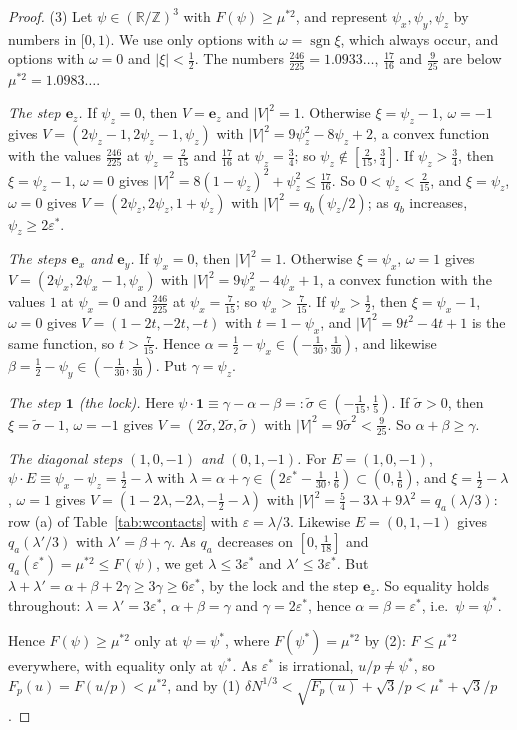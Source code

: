\documentclass[11pt]{amsart}
\theoremstyle{definition}
\theoremstyle{plain}
\newcommand{\Z}{\mathbb{Z}}
\newcommand{\e}{\mathbf{e}}
\DeclareMathOperator{\sgn}{sgn}
\providecommand{\R}{\mathbb{R}}
\begin{document}
\begin{proof}
(3) Let $\psi\in(\R/\Z)^3$ with $F(\psi)\ge\mu^{*2}$, and represent $\psi_x,\psi_y,\psi_z$ by numbers in $[0,1)$. We use only options with $\omega=\sgn\xi$, which always occur, and options with $\omega=0$ and $|\xi|<\frac12$. The numbers $\frac{246}{225}=1.0933\ldots$, $\frac{17}{16}$ and $\frac9{25}$ are below $\mu^{*2}=1.0983\ldots$.

\emph{The step $\e_z$.} If $\psi_z=0$, then $V=\e_z$ and $|V|^2=1$. Otherwise $\xi=\psi_z-1$, $\omega=-1$ gives $V=(2\psi_z-1,2\psi_z-1,\psi_z)$ with $|V|^2=9\psi_z^2-8\psi_z+2$, a convex function with the values $\frac{246}{225}$ at $\psi_z=\frac2{15}$ and $\frac{17}{16}$ at $\psi_z=\frac34$; so $\psi_z\notin[\frac2{15},\frac34]$. If $\psi_z>\frac34$, then $\xi=\psi_z-1$, $\omega=0$ gives $|V|^2=8(1-\psi_z)^2+\psi_z^2\le\frac{17}{16}$. So $0<\psi_z<\frac2{15}$, and $\xi=\psi_z$, $\omega=0$ gives $V=(2\psi_z,2\psi_z,1+\psi_z)$ with $|V|^2=q_b(\psi_z/2)$; as $q_b$ increases, $\psi_z\ge2\varepsilon^*$.

\emph{The steps $\e_x$ and $\e_y$.} If $\psi_x=0$, then $|V|^2=1$. Otherwise $\xi=\psi_x$, $\omega=1$ gives $V=(2\psi_x,2\psi_x-1,\psi_x)$ with $|V|^2=9\psi_x^2-4\psi_x+1$, a convex function with the values $1$ at $\psi_x=0$ and $\frac{246}{225}$ at $\psi_x=\frac7{15}$; so $\psi_x>\frac7{15}$. If $\psi_x>\frac12$, then $\xi=\psi_x-1$, $\omega=0$ gives $V=(1-2t,-2t,-t)$ with $t=1-\psi_x$, and $|V|^2=9t^2-4t+1$ is the same function, so $t>\frac7{15}$. Hence $\alpha=\frac12-\psi_x\in(-\frac1{30},\frac1{30})$, and likewise $\beta=\frac12-\psi_y\in(-\frac1{30},\frac1{30})$. Put $\gamma=\psi_z$.

\emph{The step $\mathbf 1$ (the lock).} Here $\psi\cdot\mathbf 1\equiv\gamma-\alpha-\beta=:\tilde\sigma\in(-\frac1{15},\frac15)$. If $\tilde\sigma>0$, then $\xi=\tilde\sigma-1$, $\omega=-1$ gives $V=(2\tilde\sigma,2\tilde\sigma,\tilde\sigma)$ with $|V|^2=9\tilde\sigma^2<\frac9{25}$. So $\alpha+\beta\ge\gamma$.

\emph{The diagonal steps $(1,0,-1)$ and $(0,1,-1)$.} For $E=(1,0,-1)$, $\psi\cdot E\equiv\psi_x-\psi_z=\frac12-\lambda$ with $\lambda=\alpha+\gamma\in(2\varepsilon^*-\frac1{30},\frac16)\subset(0,\frac16)$, and $\xi=\frac12-\lambda$, $\omega=1$ gives $V=(1-2\lambda,-2\lambda,-\frac12-\lambda)$ with $|V|^2=\frac54-3\lambda+9\lambda^2=q_a(\lambda/3)$: row (a) of Table~\ref{tab:wcontacts} with $\varepsilon=\lambda/3$. Likewise $E=(0,1,-1)$ gives $q_a(\lambda'/3)$ with $\lambda'=\beta+\gamma$. As $q_a$ decreases on $[0,\frac1{18}]$ and $q_a(\varepsilon^*)=\mu^{*2}\le F(\psi)$, we get $\lambda\le3\varepsilon^*$ and $\lambda'\le3\varepsilon^*$. But $\lambda+\lambda'=\alpha+\beta+2\gamma\ge3\gamma\ge6\varepsilon^*$, by the lock and the step $\e_z$. So equality holds throughout: $\lambda=\lambda'=3\varepsilon^*$, $\alpha+\beta=\gamma$ and $\gamma=2\varepsilon^*$, hence $\alpha=\beta=\varepsilon^*$, i.e.\ $\psi=\psi^*$.

Hence $F(\psi)\ge\mu^{*2}$ only at $\psi=\psi^*$, where $F(\psi^*)=\mu^{*2}$ by (2): $F\le\mu^{*2}$ everywhere, with equality only at $\psi^*$. As $\varepsilon^*$ is irrational, $u/p\ne\psi^*$, so $F_p(u)=F(u/p)<\mu^{*2}$, and by (1) $\delta N^{1/3}<\sqrt{F_p(u)}+\sqrt3/p<\mu^*+\sqrt3/p$.
\end{proof}
\end{document}
